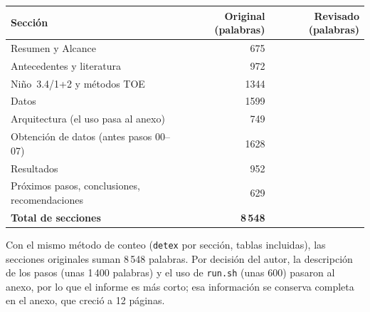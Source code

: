 \begin{center}\small
\begin{tabular}{@{}lrr@{}}
\toprule
Sección & Original (palabras) & Revisado (palabras) \\
\midrule
Resumen y Alcance & 675 &  \\
Antecedentes y literatura & 972 &  \\
Niño~3.4/1+2 y métodos TOE & 1344 &  \\
Datos & 1599 &  \\
Arquitectura (el uso pasa al anexo) & 749 &  \\
Obtención de datos (antes pasos 00--07) & 1628 &  \\
Resultados & 952 &  \\
Próximos pasos, conclusiones, recomendaciones & 629 &  \\
\midrule
\textbf{Total de secciones} & \textbf{8\,548} & \textbf{} \\
\bottomrule
\end{tabular}
\end{center}

Con el mismo método de conteo (\texttt{detex} por sección, tablas incluidas), las secciones originales suman 8\,548 palabras. Por decisión del autor, la descripción de los pasos (unas 1\,400 palabras) y el uso de \texttt{run.sh} (unas 600) pasaron al anexo, por lo que el informe es más corto; esa información se conserva completa en el anexo, que creció a 12 páginas.


